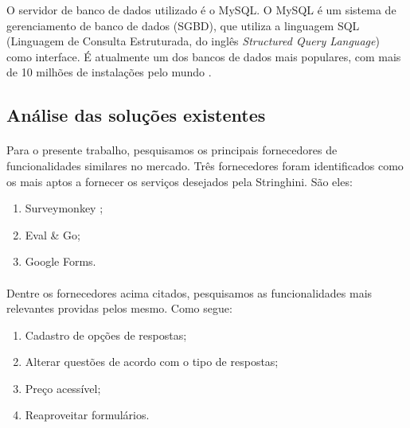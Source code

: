 \documentclass[11pt]{article}
\begin{document}
          O servidor de banco de dados utilizado é o MySQL. 
          O MySQL é um sistema de gerenciamento de banco de dados (SGBD), 
          que utiliza a linguagem SQL (Linguagem de Consulta Estruturada, 
          do inglês {\em Structured Query Language}) como interface. 
          É atualmente um dos bancos de dados mais populares, 
          com mais de 10 milhões de instalações pelo mundo \cite{website:mysql}.
  
  \clearpage
  
      \subsection{Análise das soluções existentes}

      \paragraph{}

      Para o presente trabalho, pesquisamos os principais fornecedores de 
      funcionalidades similares no mercado. Três fornecedores foram 
      identificados como os mais aptos a fornecer os serviços desejados
      pela Stringhini. São eles:

      \begin{enumerate}
        \item Surveymonkey \cite{website:surveymonkey};
        \item Eval \& Go\cite{website:evalgo};
        \item Google Forms\cite{website:googleforms}.
      \end{enumerate}

      \paragraph{}
      
      Dentre os fornecedores acima citados, pesquisamos as 
      funcionalidades mais relevantes providas pelos mesmo. Como segue:

      \begin{enumerate}
        \item Cadastro de opções de respostas;
        \item Alterar questões de acordo com o tipo de respostas;
        \item Preço acessível;
        \item Reaproveitar formulários.
      \end{enumerate}
\end{document}
